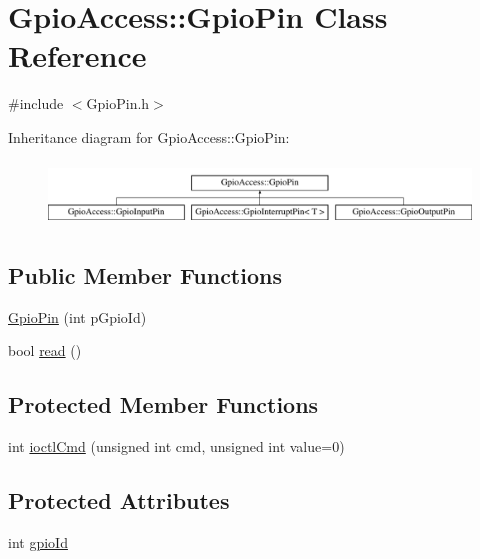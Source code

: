 \hypertarget{class_gpio_access_1_1_gpio_pin}{\section{\-Gpio\-Access\-:\-:\-Gpio\-Pin \-Class \-Reference}
\label{class_gpio_access_1_1_gpio_pin}
}


{\ttfamily \#include $<$\-Gpio\-Pin.\-h$>$}

\-Inheritance diagram for \-Gpio\-Access\-:\-:\-Gpio\-Pin\-:\begin{figure}[H]
\begin{center}
\leavevmode
\includegraphics[height=1.728395cm]{class_gpio_access_1_1_gpio_pin}
\end{center}
\end{figure}
\subsection*{\-Public \-Member \-Functions}
\begin{DoxyCompactItemize}
\item 
\hyperlink{class_gpio_access_1_1_gpio_pin_ad212b4623cd8e4f6dda1335774f54f2f}{\-Gpio\-Pin} (int p\-Gpio\-Id)
\item 
bool \hyperlink{class_gpio_access_1_1_gpio_pin_a91c4e6b319184b943ed6094d10056348}{read} ()
\end{DoxyCompactItemize}
\subsection*{\-Protected \-Member \-Functions}
\begin{DoxyCompactItemize}
\item 
int \hyperlink{class_gpio_access_1_1_gpio_pin_a407236169f0e60364db7618c12fe29e9}{ioctl\-Cmd} (unsigned int cmd, unsigned int value=0)
\end{DoxyCompactItemize}
\subsection*{\-Protected \-Attributes}
\begin{DoxyCompactItemize}
\item 
int \hyperlink{class_gpio_access_1_1_gpio_pin_a662d9f6e22d338e0b182b3220a42f25d}{gpio\-Id}
\end{DoxyCompactItemize}
